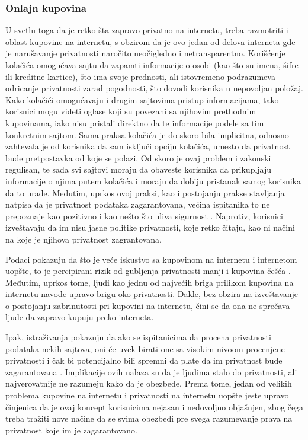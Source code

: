 \documentclass[a4paper]{article}
\begin{document}
\subsubsection{Onlajn kupovina} 
U svetlu toga da je retko šta zapravo privatno na internetu, treba razmotriti i oblast kupovine na internetu, s obzirom da je ovo jedan od delova interneta gde je narušavanje privatnosti naročito neočigledno i netransparentno. Korišćenje kolačića omogućava sajtu da zapamti informacije o osobi (kao što su imena, šifre ili kreditne kartice), što ima svoje prednosti, ali istovremeno podrazumeva odricanje privatnosti zarad pogodnosti, što dovodi korisnika u nepovoljan položaj. Kako kolačići omogućavaju i drugim sajtovima pristup informacijama, tako korisnici mogu videti oglase koji su povezani sa njihovim prethodnim kupovinama, iako nisu pristali direktno da te informacije podele sa tim konkretnim sajtom. Sama praksa kolačića je do skoro bila implicitna, odnosno zahtevala je od korisnika da sam isključi opciju kolačića, umesto da privatnost bude pretpostavka od koje se polazi. Od skoro je ovaj problem i zakonski regulisan, te sada svi sajtovi moraju da obaveste korisnika da prikupljaju informacije o njima putem kolačića i moraju da dobiju pristanak samog korisnika da to urade. Međutim, uprkos ovoj praksi, kao i postojanju prakse stavljanja natpisa da je privatnost podataka zagarantovana, većina ispitanika to ne prepoznaje kao pozitivno i kao nešto što uliva sigurnost \cite{cookies2}. Naprotiv, korisnici izveštavaju da im nisu jasne politike privatnosti, koje retko čitaju, kao ni načini na koje je njihova privatnost zagrantovana.
\par Podaci pokazuju da što je veće iskustvo sa kupovinom na internetu i internetom uopšte, to je percipirani rizik od gubljenja privatnosti manji i kupovina češća \cite{cookies3}. Međutim, uprkos tome, ljudi kao jednu od najvećih briga prilikom kupovina na internetu navode upravo brigu oko privatnosti. Dakle, bez obzira na izveštavanje o postojanju zabrinutosti pri kupovini na internetu, čini se da ona ne sprečava ljude da zapravo kupuju preko interneta.
\par Ipak, istraživanja pokazuju da ako se ispitanicima da procena privatnosti podataka nekih sajtova, oni će uvek birati one sa visokim nivoom procenjene privatnosti i čak bi potencijalno bili spremni da plate da im privatnost bude zagarantovana \cite{cookies2}. Implikacije ovih nalaza su da je ljudima stalo do privatnosti, ali najverovatnije ne razumeju kako da je obezbede. Prema tome, jedan od velikih problema kupovine na internetu i privatnosti na internetu uopšte jeste upravo činjenica da je ovaj koncept korisnicima nejasan i nedovoljno objašnjen, zbog čega treba tražiti nove načine da se svima obezbedi pre svega razumevanje prava na privatnost koje im je zagarantovano.
\end{document}
